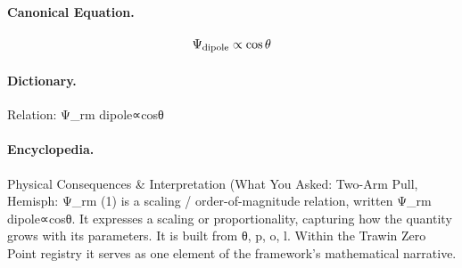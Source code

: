 \paragraph{Canonical Equation.}
\[
\Psi_{\rm dipole}\propto\cos\theta
\]

\paragraph{Dictionary.}
Relation: Ψ\_rm dipole∝cosθ

\paragraph{Encyclopedia.}
Physical Consequences \& Interpretation (What You Asked: Two-Arm Pull, Hemisph: Ψ\_rm (1) is a scaling / order-of-magnitude relation, written Ψ\_rm dipole∝cosθ. It expresses a scaling or proportionality, capturing how the quantity grows with its parameters. It is built from θ, p, o, l. Within the Trawin Zero Point registry it serves as one element of the framework's mathematical narrative.
